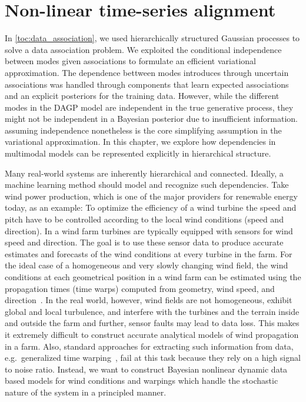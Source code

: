 \chapter{Non-linear time-series alignment}
\label{toc:alignment}
In \cref{toc:data_association}, we used hierarchically structured Gaussian processes to solve a data association problem.
We exploited the conditional independence between modes given associations to formulate an efficient variational approximation.
The dependence bettween modes introduces through uncertain associations was handled through components that learn expected associations and an explicit posteriors for the training data.
However, while the different modes in the DAGP model are independent in the true generative process, they might not be independent in a Bayesian posterior due to insufficient information.
assuming independence nonetheless is the core simplifying assumption in the variational approximation.
In this chapter, we explore how dependencies in multimodal models can be represented explicitly in hierarchical structure.

Many real-world systems are inherently hierarchical and connected.
Ideally, a machine learning method should model and recognize such dependencies.
Take wind power production, which is one of the major providers for renewable energy today, as an example:
To optimize the efficiency of a wind turbine the speed and pitch have to be controlled according to the local wind conditions (speed and direction).
In a wind farm turbines are typically equipped with sensors for wind speed and direction.
The goal is to use these sensor data to produce accurate estimates and forecasts of the wind conditions at every turbine in the farm.
For the ideal case of a homogeneous and very slowly changing wind field, the wind conditions at each geometrical position in a wind farm can be estimated using the propagation times (time warps) computed from geometry, wind speed, and direction~\parencite{soleimanzadeh_controller_2011,bitar_coordinated_2013,schepers_improved_2007}.
In the real world, however, wind fields are not homogeneous, exhibit global and local turbulence, and interfere with the turbines and the terrain inside and outside the farm and further, sensor faults may lead to data loss.
This makes it extremely difficult to construct accurate analytical models of wind propagation in a farm.
Also, standard approaches for extracting such information from data, e.g.\ generalized time warping~\parencite{zhou_generalized_2012}, fail at this task because they rely on a high signal to noise ratio.
Instead, we want to construct Bayesian nonlinear dynamic data based models for wind conditions and warpings which handle the stochastic nature of the system in a principled manner.

